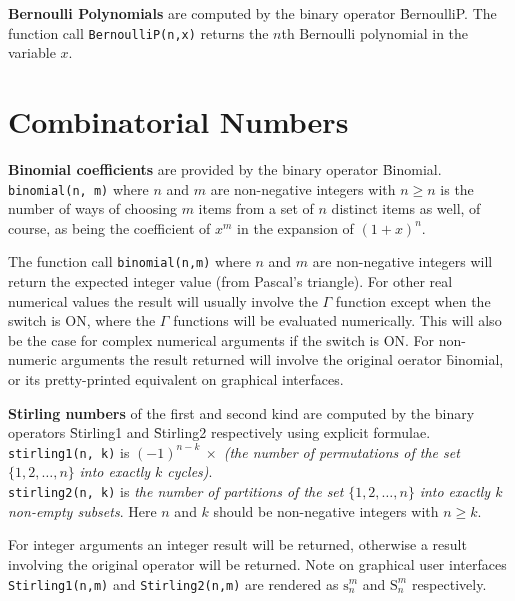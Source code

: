 \textbf{Bernoulli Polynomials} are computed by the binary operator 
\f{BernoulliP}. The function call \texttt{BernoulliP(n,x)} returns the
$n$th Bernoulli polynomial in the variable $x$.

\section{Combinatorial Numbers}
  
\textbf{Binomial coefficients} are provided by the binary operator \f{Binomial}.
\texttt{binomial(n, m)} where $n$ and $m$ are non-negative
integers with $n \geq n$ is the number of ways of choosing $m$ items from a
set of $n$ distinct items as well, of course, as being the coefficient of $x^m$
in the expansion of $(1+x)^n$.

The function call \texttt{binomial(n,m)} where $n$ and $m$
 are non-negative integers will return the expected integer value
 (from Pascal's triangle). For other real numerical values the result will
 usually involve the $\Gamma$ function except when the switch
  is ON, where the $\Gamma$ functions will be evaluated numerically.
 This will also be the case for complex numerical arguments if the switch
  is ON.  For non-numeric arguments the result returned will
 involve the original oerator \f{binomial}, or its pretty-printed equivalent
 on graphical interfaces.

\hypertarget{operator:Stirling1}{}\hypertarget{operator:Stirling2}{}
\textbf{Stirling numbers} of the first and second kind are computed 
by the binary operators \f{Stirling1} and \f{Stirling2}
respectively using explicit formulae.
\texttt{stirling1(n, k)} is $(-1)^{n-k}\ \times$
\emph{(the number of permutations of the set} $\{1, 2, \ldots, n\}$
\emph{into exactly $k$ cycles)}.\\
\texttt{stirling2(n, k)} is \emph{the number of partitions of the set}
$\{1, 2, \ldots, n\}$ \emph{into exactly $k$ non-empty subsets}.
Here $n$ and $k$ should be non-negative integers with $n \geq k$. 

For integer arguments an integer result will be
returned, otherwise a result involving the original operator will be returned.
Note on graphical user interfaces \texttt{Stirling1(n,m)} and
\texttt{Stirling2(n,m)} are rendered as
$\mathrm{s}_n^m$ and $\mathrm{S}_n^m$ respectively.

